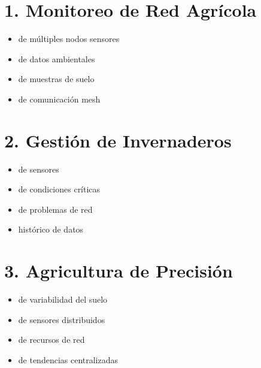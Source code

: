 \documentclass[a4paper,11pt,spanish]{sphinxmanual}
\begin{document}
\section{1. Monitoreo de Red Agrícola}
\label{\detokenize{index:monitoreo-de-red-agricola}}\begin{itemize}
\item {} 
\sphinxAtStartPar
{} de múltiples nodos sensores

\item {} 
\sphinxAtStartPar
{} de datos ambientales

\item {} 
\sphinxAtStartPar
{} de muestras de suelo

\item {} 
\sphinxAtStartPar
{} de comunicación mesh

\end{itemize}


\section{2. Gestión de Invernaderos}
\label{\detokenize{index:gestion-de-invernaderos}}\begin{itemize}
\item {} 
\sphinxAtStartPar
{} de sensores

\item {} 
\sphinxAtStartPar
{} de condiciones críticas

\item {} 
\sphinxAtStartPar
{} de problemas de red

\item {} 
\sphinxAtStartPar
{} histórico de datos

\end{itemize}


\section{3. Agricultura de Precisión}
\label{\detokenize{index:agricultura-de-precision}}\begin{itemize}
\item {} 
\sphinxAtStartPar
{} de variabilidad del suelo

\item {} 
\sphinxAtStartPar
{} de sensores distribuidos

\item {} 
\sphinxAtStartPar
{} de recursos de red

\item {} 
\sphinxAtStartPar
{} de tendencias centralizadas

\end{itemize}
\end{document}
